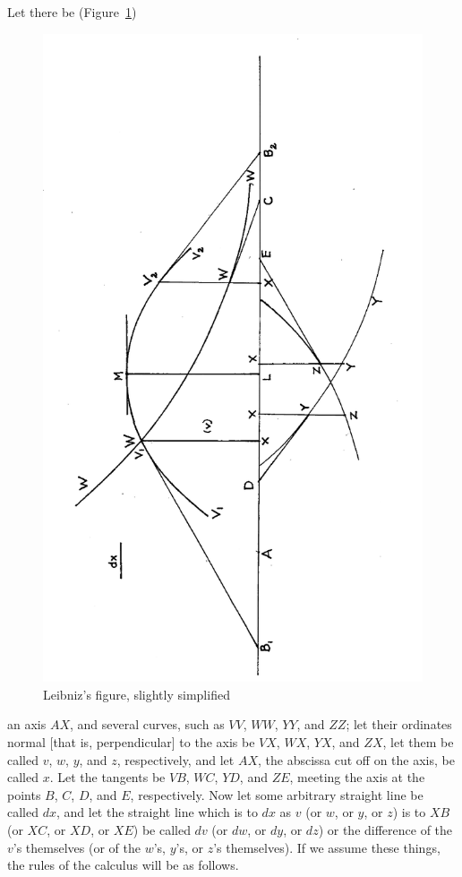 \documentclass[polutonikogreek,english,twoside,openright]{article}
\begin{document}
Let there be (Figure~\ref{newmeth1})
\begin{figure}[htp]
  \begin{center}
 \includegraphics[width=.85\textwidth]{fig/Figure2}
    \caption{Leibniz's figure, slightly simplified}
    \label{newmeth1}
  \end{center}
\end{figure}
an axis $AX$, and several curves, such as $VV$, $WW$, $YY$, and $ZZ$;
let their ordinates normal [that is, perpendicular] to the axis be
$VX$, $WX$, $YX$, and $ZX$, let them be called $v$, $w$, $y$, and $z$,
respectively, and let $AX$, the abscissa cut off on the axis, be
called $x$. Let the tangents be
$VB$, $WC$, $YD$, and $ZE$, meeting the axis at the points $B$, $C$,
$D$, and $E$, respectively.  Now let some arbitrary straight line be
called $dx$, and let the straight line which is to $dx$ as $v$ (or
$w$, or $y$, or $z$) is to $XB$ (or $XC$, or $XD$, or $XE$) be called
$dv$ (or $dw$, or $dy$, or $dz$) or the difference of the $v$'s
themselves (or of the $w$'s, $y$'s, or $z$'s
themselves).\label{diffdef} If
we assume these things, the rules of the calculus will be as follows.
\end{document}
